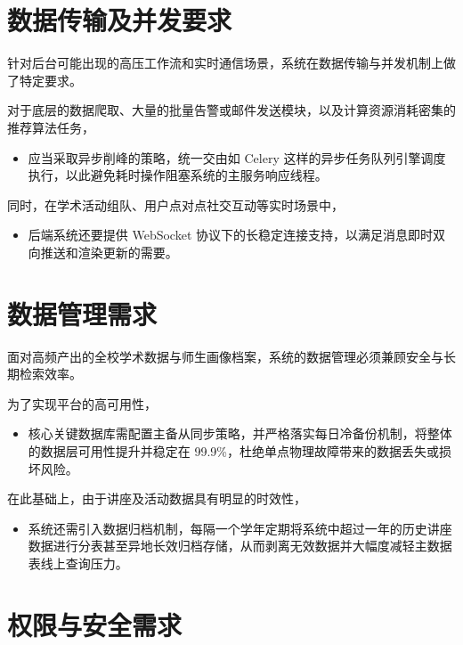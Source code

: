 \documentclass[UTF8,a4paper,12pt,fontset=none]{ctexrep}
\begin{document}
\section{数据传输及并发要求}

针对后台可能出现的高压工作流和实时通信场景，系统在数据传输与并发机制上做了特定要求。

对于底层的数据爬取、大量的批量告警或邮件发送模块，以及计算资源消耗密集的推荐算法任务，

\begin{itemize}[leftmargin=2.5em]
\item 应当采取异步削峰的策略，统一交由如 Celery 这样的异步任务队列引擎调度执行，以此避免耗时操作阻塞系统的主服务响应线程。
\end{itemize}

同时，在学术活动组队、用户点对点社交互动等实时场景中，

\begin{itemize}[leftmargin=2.5em]
\item 后端系统还要提供 WebSocket 协议下的长稳定连接支持，以满足消息即时双向推送和渲染更新的需要。
\end{itemize}

\section{数据管理需求}

面对高频产出的全校学术数据与师生画像档案，系统的数据管理必须兼顾安全与长期检索效率。

为了实现平台的高可用性，

\begin{itemize}[leftmargin=2.5em]
\item 核心关键数据库需配置主备从同步策略，并严格落实每日冷备份机制，将整体的数据层可用性提升并稳定在 99.9\%，杜绝单点物理故障带来的数据丢失或损坏风险。
\end{itemize}

在此基础上，由于讲座及活动数据具有明显的时效性，

\begin{itemize}[leftmargin=2.5em]
\item 系统还需引入数据归档机制，每隔一个学年定期将系统中超过一年的历史讲座数据进行分表甚至异地长效归档存储，从而剥离无效数据并大幅度减轻主数据表线上查询压力。
\end{itemize}

\section{权限与安全需求}
\end{document}
